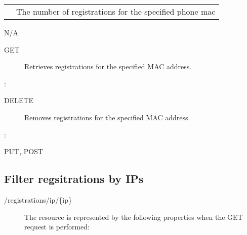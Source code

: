 \documentclass[letterpaper,10pt,english]{sphinxmanual}
\begin{document}
\begin{savenotes}\sphinxattablestart
\centering
\begin{tabulary}{\linewidth}[t]{|T|T|}
\hline

&
\\
\hline
{}
&
The number of registrations for the specified phone mac
\\
\hline
\end{tabulary}
\par
\sphinxattableend\end{savenotes}

 N/A
\begin{description}
\item[{ GET}] \leavevmode
Retrieves registrations for the specified MAC address.

\end{description}

:

\begin{sphinxVerbatim}[commandchars=\\\{\}]
\end{sphinxVerbatim}
\begin{description}
\item[{ DELETE}] \leavevmode
Removes registrations for the specified MAC address.

\end{description}

:

\begin{sphinxVerbatim}[commandchars=\\\{\}]
\end{sphinxVerbatim}

 PUT, POST


\subsection{Filter regsitrations by IPs}
\label{\detokenize{restapi:filter-regsitrations-by-ips}}
 /registrations/ip/\{ip\}
\begin{description}
\item[{}] \leavevmode
The resource is represented by the following properties when the GET request is performed:

\end{description}
\end{document}
